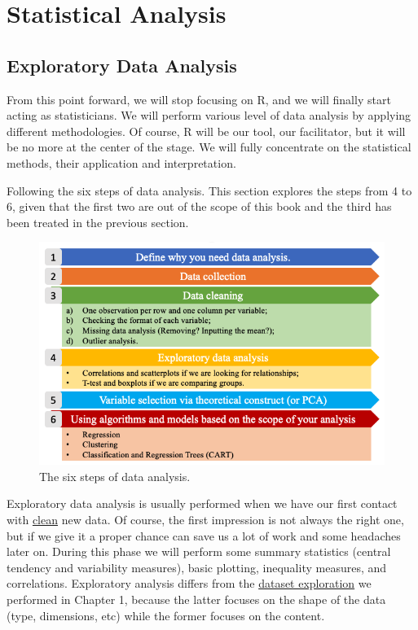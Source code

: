 \documentclass[
]{svmono}
\begin{document}
\hypertarget{part-statistical-analysis}{%
\part{Statistical Analysis}\label{part-statistical-analysis}}

\hypertarget{exploratory-data-analysis}{%
\chapter{Exploratory Data Analysis}\label{exploratory-data-analysis}}

\justifying

From this point forward, we will stop focusing on R, and we will finally
start acting as statisticians. We will perform various level of data
analysis by applying different methodologies. Of course, R will be our
tool, our facilitator, but it will be no more at the center of the
stage. We will fully concentrate on the statistical methods, their
application and interpretation.

Following the six steps of data analysis. This section explores the
steps from 4 to 6, given that the first two are out of the scope of this
book and the third has been treated in the previous section.

\begin{figure}[H]

{\centering \includegraphics[width=0.8\linewidth,]{images/Schermata 2022-03-28 alle 10.36.15} 

}

\caption{The six steps of data analysis.}\label{fig:unnamed-chunk-37}
\end{figure}

Exploratory data analysis is usually performed when we have our first
contact with \ul{clean} new data. Of course, the first
impression is not always the right one, but if we give it a proper
chance can save us a lot of work and some headaches later on. During
this phase we will perform some summary statistics (central tendency and
variability measures), basic plotting, inequality measures, and
correlations. Exploratory analysis differs from the \protect\hyperlink{dataset-exploration}{dataset
exploration} we performed in Chapter 1, because the latter focuses on
the shape of the data (type, dimensions, etc) while the former focuses
on the content.
\end{document}
